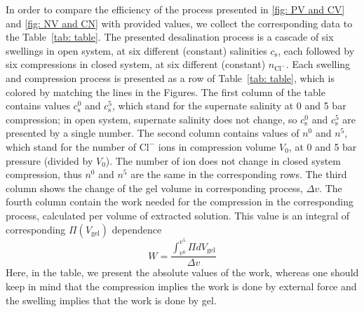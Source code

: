 \documentclass[journal,article,submit,pdftex,moreauthors]{Definitions/mdpi}
\newcommand{\ncl}{n_\mathrm{Cl^-}}
\newcommand{\cl}{\mathrm{Cl^-}}
\newcommand{\cs}{c_{\mathrm{s}}}
\newcommand{\Vgel}{V_\mathrm{gel}}
\newcommand{\Pgel}{\Pi}
\newcommand{\Vbox}{V_0}
\begin{document}
In order to compare the efficiency of the process presented in \ref{fig: PV and CV} and \ref{fig: NV and CN} with provided values, we collect the corresponding data to the Table~\ref{tab: table}.
The presented desalination process is a cascade of six swellings in open system, at six different (constant) salinities $\cs$, each followed by six compressions in closed system, at six different (constant) $\ncl$.
Each swelling and compression process is presented as a row of Table~\ref{tab: table}, which is colored by matching the lines in the Figures.
The first column of the table contains values $\cs^0$ and $\cs^5$, which stand for the supernate salinity at 0 and 5 bar compression; in open system, supernate salinity does not change, so $\cs^0$ and $\cs^5$ are presented by a single number. 
The second column contains values of $n^0$ and $n^5$, which stand for the number of $\cl$ ions in compression volume $\Vbox$, at 0 and 5 bar pressure (divided by $\Vbox$). 
The number of ion does not change in closed system compression, thus $n^0$ and $n^5$ are the same in the corresponding rows.
The third column shows the change of the gel volume in corresponding process, $\Delta v$. 
The fourth column contain the work needed for the compression in the corresponding process, calculated per volume of extracted solution. 
This value is an integral of corresponding $\Pgel(\Vgel)$ dependence
\begin{equation}
    W = \frac{\int_{v^0}^{v^5} \Pgel d\Vgel}{\Delta v}
\end{equation}
Here, in the table, we present the absolute values of the work, whereas one should keep in mind that the compression implies the work is done by external force and the swelling implies that the work is done by gel.
\end{document}
